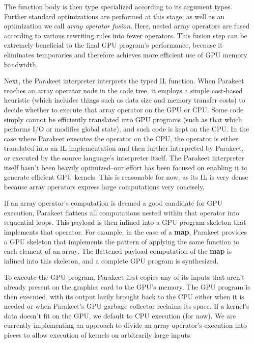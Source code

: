 \documentclass[preprint]{sigplanconf}
\begin{document}
The function body is then type specialized according to its argument
types.  Further standard optimizations are performed at this stage, as well as
an optimization we call \emph{array operator fusion}.  Here, nested array
operators are fused according to various rewriting rules into fewer operators.
This fusion step can be extremely beneficial to the final GPU
program's performance, because it eliminates temporaries and therefore 
achieves more
efficient use of GPU memory bandwidth.

Next, the Parakeet interpreter interprets the typed IL function.  When
Parakeet reaches an array operator node in the code tree, it employs a simple
cost-based heuristic (which includes things such as data size and memory
transfer costs) to decide whether to execute that array operator on the GPU or
CPU.  Some code simply cannot be efficiently translated into GPU programs
(such as that which performs I/O or modifies global state), and such code is
kept on the CPU. In the case where Parakeet executes the operator on the CPU,
the operator is either translated into an IL implementation and then further
interpreted by Parakeet, or executed by the source language's interpreter
itself. The Parakeet interpreter itself hasn't been heavily optimized--our
effort has been focused on enabling it to generate efficient GPU kernels.  This
is reasonable for now, as its IL is very dense because array operators
express large computations very concisely.

If an array operator's computation is deemed a good candidate for GPU
execution, Parakeet flattens all computations nested within that operator
into sequential loops.  This payload is then inlined into a GPU
program skeleton that implements that operator.  For example, in the case of a
\textbf{map}, Parakeet provides a GPU skeleton that implements the pattern of
applying the same function to each element of an array.  The
flattened payload computation of the \textbf{map} is inlined into this
skeleton, and a complete GPU program is synthesized.

To execute the GPU program, Parakeet first copies any of its inputs
that aren't already present on the graphics card to the GPU's memory.  The GPU
program is then executed, with its output lazily brought back to the CPU either
when it is needed or when Parakeet's GPU garbage collector reclaims its space.
If a kernel's data doesn't fit on the GPU, we default to CPU
execution (for now).  We are currently implementing an 
approach to divide
an array operator's execution into pieces to allow execution of
kernels on arbitrarily large inputs.
\end{document}

